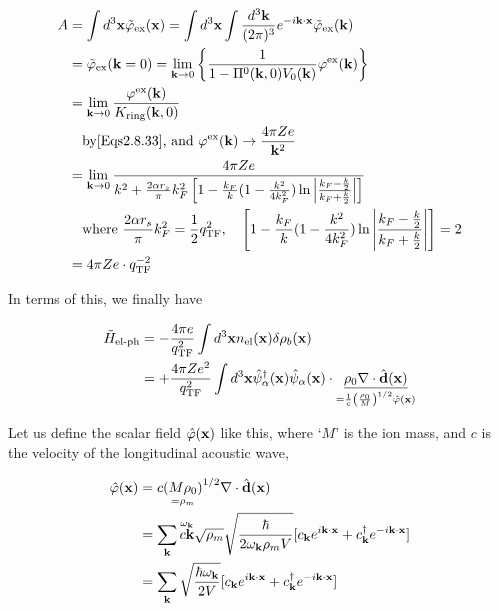 \[\begin{split}
A &=\int d^3{\bf x}\tilde\varphi_{\text{ex}}({\bf x}) = \int d^3{\bf x}\int \frac{d^3\bf k}{(2\pi)^3}e^{-i\bf k\cdot x}\tilde\varphi_{\text{ex}}({\bf k})\\
&=\tilde\varphi_{\text{ex}}({\bf k} = 0) = \lim_{{\bf k}\to0}\left\{\frac{1}{1 - \Pi^0({\bf k},0)V_0({\bf k})}\varphi^{\text{ex}}({\bf k}) \right\}\\
&=\lim_{{\bf k}\to0}\frac{\varphi^{\text{ex}}({\bf k})}{K_{\text{ring}}({\bf k},0)}\\
&\quad \text{by\eqref{Eqs2.8.33}, and }\varphi^{\text{ex}}({\bf k}) \to \frac{4\pi Ze}{{\bf k}^2}\\
&=\lim_{{\bf k}\to0}\frac{4\pi Ze}{k^2+\frac{2\alpha r_s}{\pi}k_F^2\left[1 - \frac{k_F}{k}(1-\frac{k^2}{4k_F^2})\ln\left|\frac{k_F - \frac{k}{2}}{k_F + \frac{k}{2}}\right|\right]}\\
&\quad \text{where }\frac{2\alpha r_s}{\pi}k_F^2 = \frac{1}{2}q_{\text{TF}}^{2},\quad \left[1 - \frac{k_F}{k}(1-\frac{k^2}{4k_F^2})\ln\left|\frac{k_F - \frac{k}{2}}{k_F + \frac{k}{2}}\right|\right] = 2\\
&=4\pi Ze\cdot q_{\text{TF}}^{-2}
\end{split} \]

In terms of this, we finally have

\[\begin{split}
\tilde H_{\text{el-ph}} &= -\frac{4\pi e}{q_{\text{TF}}^2}\int d^3{\bf x} n_{\text{el}}({\bf x})\delta\rho_b({\bf x})\\
&= +\frac{4\pi Ze^2}{q_{\text{TF}}^2}\int d^3{\bf x}\hat{\psi}_{\alpha}^\dagger({\bf x})\hat{\psi}_{\alpha}({\bf x})\cdot\underset{=\frac{1}{c}\left(\frac{\rho_0}{M}\right)^{1/2}\hat\varphi({\bf x})}{\underline{\rho_0\nabla\cdot\hat{\bf d}({\bf x})}}
\end{split} \]

Let us define the scalar field $\hat\varphi(\bf x)$ like this, where `$M$' is the ion mass, and $c$ is the velocity of the longitudinal acoustic wave,

\[\begin{split}
\hat\varphi({\bf x}) &= c\underset{=\rho_m}{(M\rho_0)}^{1/2}\nabla\cdot\hat{\bf d}({\bf x})\\
&=\sum_{\bf k}\overset{\omega_{\bf k}}{c{\bf k}}\sqrt{\rho_m}\sqrt{\frac{\hbar}{2\omega_{\bf k}\rho_m V}}[c_{\bf k}e^{i\bf k\cdot x} + c^\dagger_{\bf k}e^{-i\bf k\cdot x}]\\
&=\sum_{\bf k}\sqrt{\frac{\hbar\omega_{\bf k}}{2V}}[c_{\bf k}e^{i\bf k\cdot x} + c^\dagger_{\bf k}e^{-i\bf k\cdot x}]
\end{split}\]

